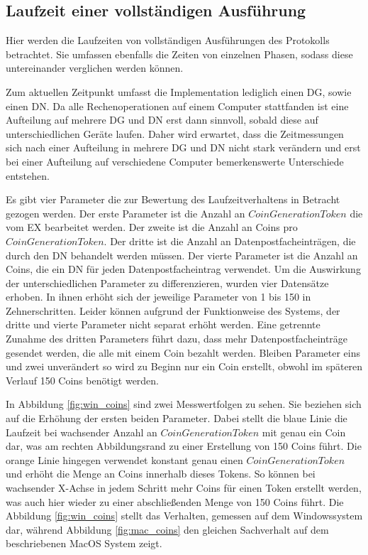 \documentclass[
	fontsize=11pt,
	headings=small,
	parskip=half,           %
	bibliography=totoc,
	numbers=noenddot,       %
	open=any,               %
]{scrreprt}
\begin{document}
\subsection{Laufzeit einer vollständigen Ausführung}
\label{subsec:fullRuntime}
Hier werden die Laufzeiten von vollständigen Ausführungen des Protokolls betrachtet. Sie umfassen ebenfalls die Zeiten von einzelnen Phasen, sodass diese untereinander verglichen werden können.

Zum aktuellen Zeitpunkt umfasst die Implementation lediglich einen DG, sowie einen DN. Da alle Rechenoperationen auf einem Computer stattfanden ist eine Aufteilung auf mehrere DG und DN erst dann sinnvoll, sobald diese auf unterschiedlichen Geräte laufen. Daher wird erwartet, dass die Zeitmessungen sich nach einer Aufteilung in mehrere DG und DN nicht stark verändern und erst bei einer Aufteilung auf verschiedene Computer bemerkenswerte Unterschiede entstehen.

Es gibt vier Parameter die zur Bewertung des Laufzeitverhaltens in Betracht gezogen werden. Der erste Parameter ist die Anzahl an $CoinGenerationToken$ die vom EX bearbeitet werden. Der zweite ist die Anzahl an Coins pro $CoinGenerationToken$. Der dritte ist die Anzahl an Datenpostfacheinträgen, die durch den DN behandelt werden müssen. Der vierte Parameter ist die Anzahl an Coins, die ein DN für jeden Datenpostfacheintrag verwendet. Um die Auswirkung der unterschiedlichen Parameter zu differenzieren, wurden vier Datensätze erhoben. In ihnen erhöht sich der jeweilige Parameter von 1 bis 150 in Zehnerschritten. Leider können aufgrund der Funktionweise des Systems, der dritte und vierte Parameter nicht separat erhöht werden. Eine getrennte Zunahme des dritten Parameters führt dazu, dass mehr Datenpostfacheinträge gesendet werden, die alle mit einem Coin bezahlt werden. Bleiben Parameter eins und zwei unverändert so wird zu Beginn nur ein Coin erstellt, obwohl im späteren Verlauf 150 Coins benötigt werden.

In Abbildung \ref{fig:win_coins} sind zwei Messwertfolgen zu sehen. Sie beziehen sich auf die Erhöhung der ersten beiden Parameter. Dabei stellt die blaue Linie die Laufzeit bei wachsender Anzahl an $CoinGenerationToken$ mit genau ein Coin dar, was am rechten Abbildungsrand zu einer Erstellung von 150 Coins führt. Die orange Linie hingegen verwendet konstant genau einen $CoinGenerationToken$ und erhöht die Menge an Coins innerhalb dieses Tokens. So können bei wachsender X-Achse in jedem Schritt mehr Coins für einen Token erstellt werden, was auch hier wieder zu einer abschließenden Menge von 150 Coins führt. Die Abbildung \ref{fig:win_coins} stellt das Verhalten, gemessen auf dem Windowssystem dar, während Abbildung \ref{fig:mac_coins} den gleichen Sachverhalt auf dem beschriebenen MacOS System zeigt.
\end{document}
